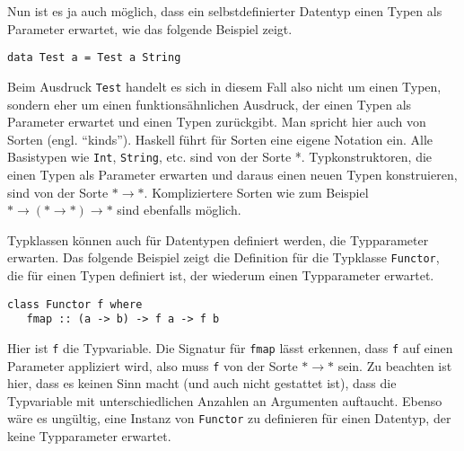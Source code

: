 Nun ist es ja auch möglich, dass ein selbstdefinierter Datentyp einen Typen als Parameter erwartet, wie das folgende Beispiel
zeigt.

\begin{verbatim}
data Test a = Test a String
\end{verbatim}

Beim Ausdruck \texttt{Test} handelt es sich in diesem Fall also nicht um einen Typen, sondern eher um einen funktionsähnlichen Ausdruck, der
einen Typen als Parameter erwartet und einen Typen zurückgibt. Man spricht hier auch von Sorten (engl. ``kinds''). Haskell
führt für Sorten eine eigene Notation ein. Alle Basistypen wie \texttt{Int}, \texttt{String}, etc. sind von der Sorte *.
Typkonstruktoren, die einen Typen als Parameter erwarten und daraus einen neuen Typen konstruieren, sind von der Sorte
$* \rightarrow *$.
Kompliziertere Sorten wie zum Beispiel $* \rightarrow (* \rightarrow *) \rightarrow *$ sind ebenfalls möglich.

Typklassen können auch für Datentypen definiert werden, die Typparameter erwarten. Das folgende Beispiel zeigt die
Definition für die Typklasse \texttt{Functor}, die für einen Typen definiert ist, der wiederum einen Typparameter erwartet.

\begin{verbatim}
class Functor f where
   fmap :: (a -> b) -> f a -> f b
\end{verbatim}

Hier ist \texttt{f} die Typvariable. Die Signatur für \texttt{fmap} lässt erkennen, dass \texttt{f} auf einen Parameter appliziert
wird, also muss \texttt{f} von der Sorte $* \rightarrow *$ sein. Zu beachten ist hier, dass es keinen Sinn macht (und auch nicht
gestattet ist), dass die Typvariable mit unterschiedlichen Anzahlen an Argumenten auftaucht. Ebenso wäre es ungültig,
eine Instanz von \texttt{Functor} zu definieren für einen Datentyp, der keine Typparameter erwartet.
